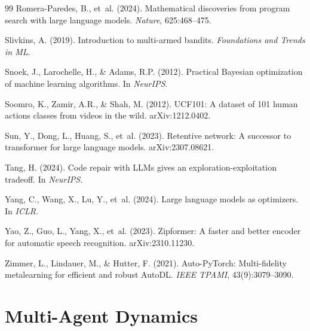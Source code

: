 \documentclass{article}
\begin{document}
\begin{thebibliography}{99}
Romera-Paredes, B., et~al. (2024).
\newblock Mathematical discoveries from program search with large language models.
\newblock \emph{Nature}, 625:468--475.

Slivkins, A. (2019).
\newblock Introduction to multi-armed bandits.
\newblock \emph{Foundations and Trends in ML}.

Snoek, J., Larochelle, H., \& Adams, R.P. (2012).
\newblock Practical Bayesian optimization of machine learning algorithms.
\newblock In \emph{NeurIPS}.

Soomro, K., Zamir, A.R., \& Shah, M. (2012).
\newblock UCF101: A dataset of 101 human actions classes from videos in the wild.
\newblock arXiv:1212.0402.

Sun, Y., Dong, L., Huang, S., et~al. (2023).
\newblock Retentive network: A successor to transformer for large language models.
\newblock arXiv:2307.08621.

Tang, H. (2024).
\newblock Code repair with LLMs gives an exploration-exploitation tradeoff.
\newblock In \emph{NeurIPS}.

Yang, C., Wang, X., Lu, Y., et~al. (2024).
\newblock Large language models as optimizers.
\newblock In \emph{ICLR}.

Yao, Z., Guo, L., Yang, X., et~al. (2023).
\newblock Zipformer: A faster and better encoder for automatic speech recognition.
\newblock arXiv:2310.11230.

Zimmer, L., Lindauer, M., \& Hutter, F. (2021).
\newblock Auto-PyTorch: Multi-fidelity metalearning for efficient and robust AutoDL.
\newblock \emph{IEEE TPAMI}, 43(9):3079--3090.

\end{thebibliography}


\newpage
\appendix

\section{Multi-Agent Dynamics}
\label{app:multiagent}
\end{document}
